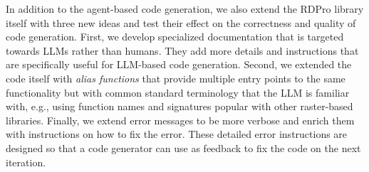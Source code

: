 In addition to the agent-based code generation, we also extend the RDPro library itself with three new ideas and test their effect on the correctness and quality of code generation.
First, we develop specialized documentation that is targeted towards LLMs rather than humans. They add more details and instructions that are specifically useful for LLM-based code generation.
Second, we extended the code itself with \emph{alias functions} that provide multiple entry points to the same functionality but with common standard terminology that the LLM is familiar with, e.g., using function names and signatures popular with other raster-based libraries.
Finally, we extend error messages to be more verbose and enrich them with instructions on how to fix the error. These detailed error instructions are designed so that a code generator can use as feedback to fix the code on the next iteration.


